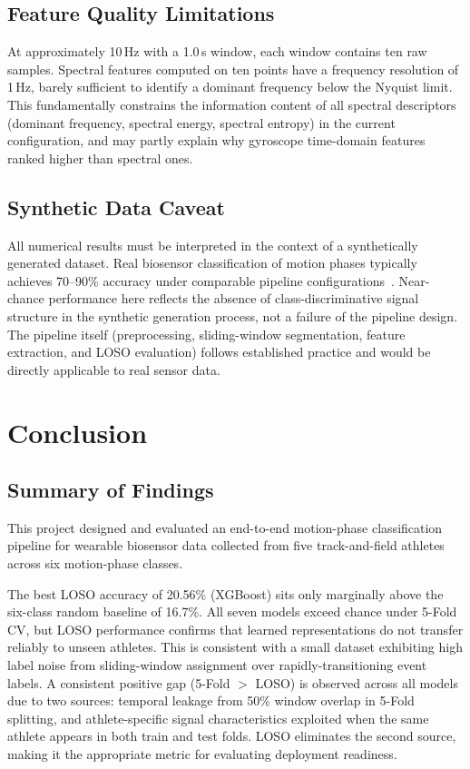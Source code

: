 \documentclass[12pt,a4paper]{cibb}
\begin{document}
\subsection{Feature Quality Limitations}
At approximately 10\,Hz with a 1.0\,s window, each window contains ten raw samples. Spectral features computed on ten points have a frequency resolution of 1\,Hz, barely sufficient to identify a dominant frequency below the Nyquist limit. This fundamentally constrains the information content of all spectral descriptors (dominant frequency, spectral energy, spectral entropy) in the current configuration, and may partly explain why gyroscope time-domain features ranked higher than spectral ones.

\subsection{Synthetic Data Caveat}
All numerical results must be interpreted in the context of a synthetically generated dataset. Real biosensor classification of motion phases typically achieves 70--90\% accuracy under comparable pipeline configurations~\cite{Vitali2020}. Near-chance performance here reflects the absence of class-discriminative signal structure in the synthetic generation process, not a failure of the pipeline design. The pipeline itself (preprocessing, sliding-window segmentation, feature extraction, and LOSO evaluation) follows established practice and would be directly applicable to real sensor data.

\section{Conclusion}
\label{sec:CONCLUSION}

\subsection{Summary of Findings}
This project designed and evaluated an end-to-end motion-phase classification pipeline for wearable biosensor data collected from five track-and-field athletes across six motion-phase classes.

The best LOSO accuracy of 20.56\% (XGBoost) sits only marginally above the six-class random baseline of 16.7\%. All seven models exceed chance under 5-Fold CV, but LOSO performance confirms that learned representations do not transfer reliably to unseen athletes. This is consistent with a small dataset exhibiting high label noise from sliding-window assignment over rapidly-transitioning event labels. A consistent positive gap (5-Fold $>$ LOSO) is observed across all models due to two sources: temporal leakage from 50\% window overlap in 5-Fold splitting, and athlete-specific signal characteristics exploited when the same athlete appears in both train and test folds. LOSO eliminates the second source, making it the appropriate metric for evaluating deployment readiness.
\end{document}
